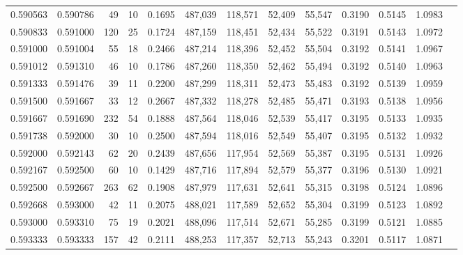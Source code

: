 \begin{tabular}{rrrrrrrrrrrrr}
0.590563 & 0.590786 &    49 &  10 &                                     0.1695 & 487,039 & 118,571 &  52,409 &  55,547 & 0.3190 & 0.5145 & 1.0983 \\
0.590833 & 0.591000 &   120 &  25 &                                     0.1724 & 487,159 & 118,451 &  52,434 &  55,522 & 0.3191 & 0.5143 & 1.0972 \\
0.591000 & 0.591004 &    55 &  18 &                                     0.2466 & 487,214 & 118,396 &  52,452 &  55,504 & 0.3192 & 0.5141 & 1.0967 \\
0.591012 & 0.591310 &    46 &  10 &                                     0.1786 & 487,260 & 118,350 &  52,462 &  55,494 & 0.3192 & 0.5140 & 1.0963 \\
0.591333 & 0.591476 &    39 &  11 &                                     0.2200 & 487,299 & 118,311 &  52,473 &  55,483 & 0.3192 & 0.5139 & 1.0959 \\
0.591500 & 0.591667 &    33 &  12 &                                     0.2667 & 487,332 & 118,278 &  52,485 &  55,471 & 0.3193 & 0.5138 & 1.0956 \\
0.591667 & 0.591690 &   232 &  54 &                                     0.1888 & 487,564 & 118,046 &  52,539 &  55,417 & 0.3195 & 0.5133 & 1.0935 \\
0.591738 & 0.592000 &    30 &  10 &                                     0.2500 & 487,594 & 118,016 &  52,549 &  55,407 & 0.3195 & 0.5132 & 1.0932 \\
0.592000 & 0.592143 &    62 &  20 &                                     0.2439 & 487,656 & 117,954 &  52,569 &  55,387 & 0.3195 & 0.5131 & 1.0926 \\
0.592167 & 0.592500 &    60 &  10 &                                     0.1429 & 487,716 & 117,894 &  52,579 &  55,377 & 0.3196 & 0.5130 & 1.0921 \\
0.592500 & 0.592667 &   263 &  62 &                                     0.1908 & 487,979 & 117,631 &  52,641 &  55,315 & 0.3198 & 0.5124 & 1.0896 \\
0.592668 & 0.593000 &    42 &  11 &                                     0.2075 & 488,021 & 117,589 &  52,652 &  55,304 & 0.3199 & 0.5123 & 1.0892 \\
0.593000 & 0.593310 &    75 &  19 &                                     0.2021 & 488,096 & 117,514 &  52,671 &  55,285 & 0.3199 & 0.5121 & 1.0885 \\
0.593333 & 0.593333 &   157 &  42 &                                     0.2111 & 488,253 & 117,357 &  52,713 &  55,243 & 0.3201 & 0.5117 & 1.0871 \\

\end{tabular}
